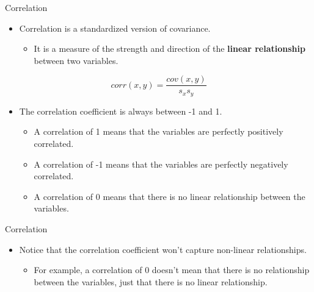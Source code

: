 \documentclass[
  10pt,
  ignorenonframetext,
]{beamer}
\providecommand{\tightlist}{%
  \setlength{\itemsep}{0pt}\setlength{\parskip}{0pt}}\usepackage{longtable,booktabs,array}
\begin{document}
\begin{frame}{Correlation}
\label{correlation}
\begin{itemize}
\tightlist
\item
  Correlation is a standardized version of covariance.

  \begin{itemize}
  \tightlist
  \item
    It is a measure of the strength and direction of the \textbf{linear
    relationship} between two variables.
  \end{itemize}
\end{itemize}

\[ corr(x, y) = \frac{cov(x, y)}{s_x s_y} \]

\begin{itemize}
\tightlist
\item
  The correlation coefficient is always between -1 and 1.

  \begin{itemize}
  \tightlist
  \item
    A correlation of 1 means that the variables are perfectly positively
    correlated.
  \item
    A correlation of -1 means that the variables are perfectly
    negatively correlated.
  \item
    A correlation of 0 means that there is no linear relationship
    between the variables.
  \end{itemize}
\end{itemize}
\end{frame}

\begin{frame}{Correlation}
\label{correlation-1}
\begin{itemize}
\tightlist
\item
  Notice that the correlation coefficient won't capture non-linear
  relationships.

  \begin{itemize}
  \tightlist
  \item
    For example, a correlation of 0 doesn't mean that there is no
    relationship between the variables, just that there is no linear
    relationship.
  \end{itemize}
\end{itemize}
\end{frame}
\end{document}
